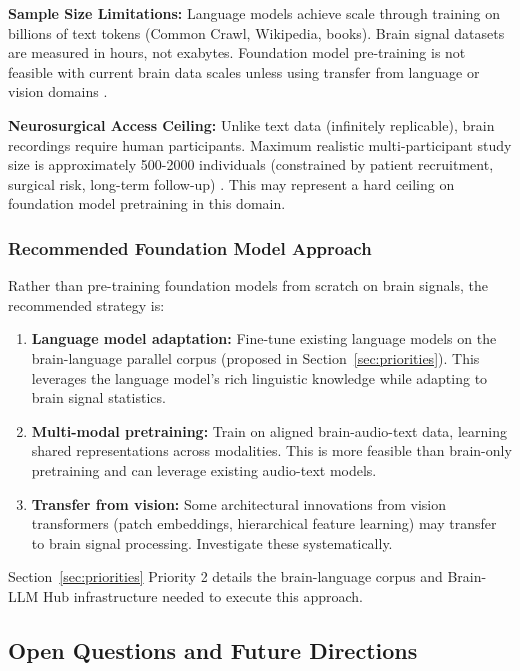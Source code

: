 \textbf{Sample Size Limitations:} Language models achieve scale through training on billions of text tokens (Common Crawl, Wikipedia, books). Brain signal datasets are measured in hours, not exabytes. Foundation model pre-training is not feasible with current brain data scales unless using transfer from language or vision domains \cite{Ye2025}.

\textbf{Neurosurgical Access Ceiling:} Unlike text data (infinitely replicable), brain recordings require human participants. Maximum realistic multi-participant study size is approximately 500-2000 individuals (constrained by patient recruitment, surgical risk, long-term follow-up) \cite{Yin2025CrossSubject,Zhou2025BrainFM}. This may represent a hard ceiling on foundation model pretraining in this domain.

\subsubsection{Recommended Foundation Model Approach}

Rather than pre-training foundation models from scratch on brain signals, the recommended strategy is:

\begin{enumerate}
    \item \textbf{Language model adaptation:} Fine-tune existing language models on the brain-language parallel corpus (proposed in Section~\ref{sec:priorities}). This leverages the language model's rich linguistic knowledge while adapting to brain signal statistics.
    
    \item \textbf{Multi-modal pretraining:} Train on aligned brain-audio-text data, learning shared representations across modalities. This is more feasible than brain-only pretraining and can leverage existing audio-text models.
    
    \item \textbf{Transfer from vision:} Some architectural innovations from vision transformers (patch embeddings, hierarchical feature learning) may transfer to brain signal processing. Investigate these systematically.
\end{enumerate}

Section~\ref{sec:priorities} Priority 2 details the brain-language corpus and Brain-LLM Hub infrastructure needed to execute this approach.

\subsection{Open Questions and Future Directions}

